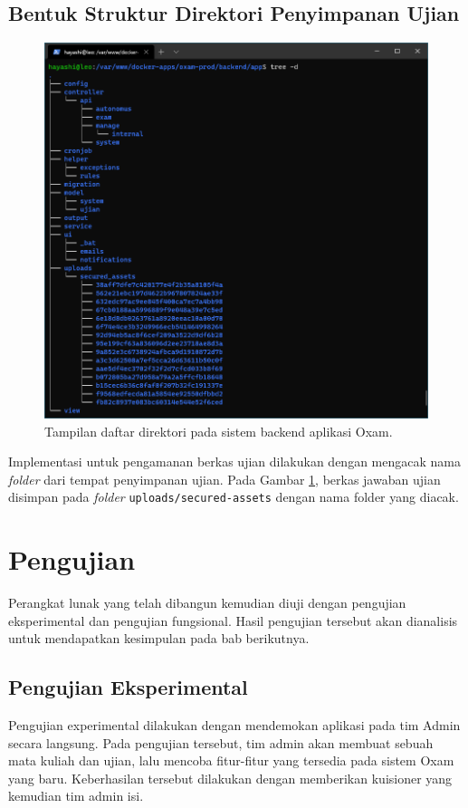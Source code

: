     \subsection{Bentuk Struktur Direktori Penyimpanan Ujian}
    \begin{figure}[htb]
        \centering
        \includegraphics[width=0.6\paperwidth]{Gambar/Screenshot 2021-01-16 014010.png}
        \caption{Tampilan daftar direktori pada sistem backend aplikasi Oxam.}
        \label{fig:dirlisting}
    \end{figure}
    Implementasi untuk pengamanan berkas ujian dilakukan dengan mengacak nama \textit{folder}
    dari tempat penyimpanan ujian. Pada Gambar \ref{fig:dirlisting}, berkas jawaban ujian disimpan pada
    \textit{folder} \texttt{uploads/secured-assets} dengan nama folder yang diacak.

\section{Pengujian}
    Perangkat lunak yang telah dibangun kemudian diuji dengan pengujian eksperimental dan pengujian fungsional.
    Hasil pengujian tersebut akan dianalisis untuk mendapatkan kesimpulan pada bab berikutnya.
    
\subsection{Pengujian Eksperimental}
    Pengujian experimental dilakukan dengan mendemokan aplikasi pada tim Admin secara langsung. Pada pengujian
    tersebut, tim admin akan membuat sebuah mata kuliah dan ujian, lalu mencoba fitur-fitur yang tersedia
    pada sistem Oxam yang baru. Keberhasilan tersebut dilakukan dengan memberikan kuisioner yang kemudian
    tim admin isi.
    
